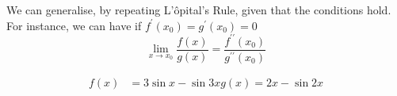 \documentclass{article}
\begin{document}
We can generalise, by repeating L'\^opital's Rule, given that the conditions hold. For instance, we can have if $f^{\prime}(x_0) = g^{\prime}(x_0) = 0$
\[
    \lim_{x \rightarrow x_0}{\frac{f(x)}{g(x)}} = \frac{f^{\prime\prime}(x_0)}{g^{\prime\prime}(x_0)}
\]

\begin{eg}
    \begin{align*}
        f(x) &= 3\sin{x} - \sin{3x}
        g(x) = 2x - \sin{2x}
    \end{align*}
\end{eg}

\end{document}
